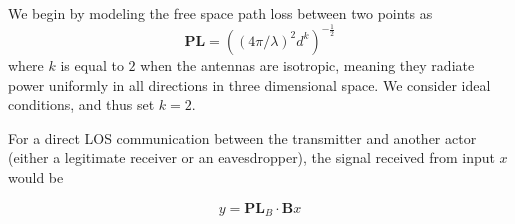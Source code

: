 We begin by modeling the free space path loss \cite{Free_space_path_loss} between two points as
\begin{equation}
  \bm{PL} = ((4 \pi / \lambda)^2 d^k)^{-\frac{1}{2}}
\end{equation}
where $k$ is equal to $2$ when the antennas are isotropic, meaning they radiate power uniformly in all directions in three dimensional space. We consider ideal conditions, and thus set $k = 2$.

For a direct LOS communication between the transmitter and another actor (either a legitimate receiver or an eavesdropper), the signal received from input $x$ would be

\begin{equation}
  y = \bm{PL}_B \cdot \bm{B}x
\end{equation}

